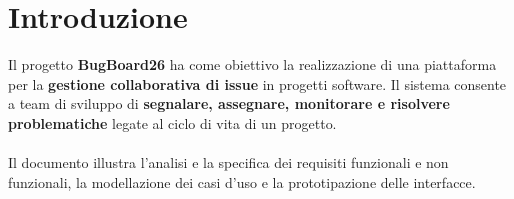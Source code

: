 
\chapter{Introduzione}
Il progetto \textbf{BugBoard26} ha come obiettivo la realizzazione di una piattaforma per la \textbf{gestione collaborativa di issue} in progetti software.
Il sistema consente a team di sviluppo di \textbf{segnalare, assegnare, monitorare e risolvere problematiche} legate al ciclo di vita di un progetto. 
\\\\
Il documento illustra l’analisi e la specifica dei requisiti funzionali e non funzionali, la modellazione dei casi d’uso e la prototipazione delle interfacce.
